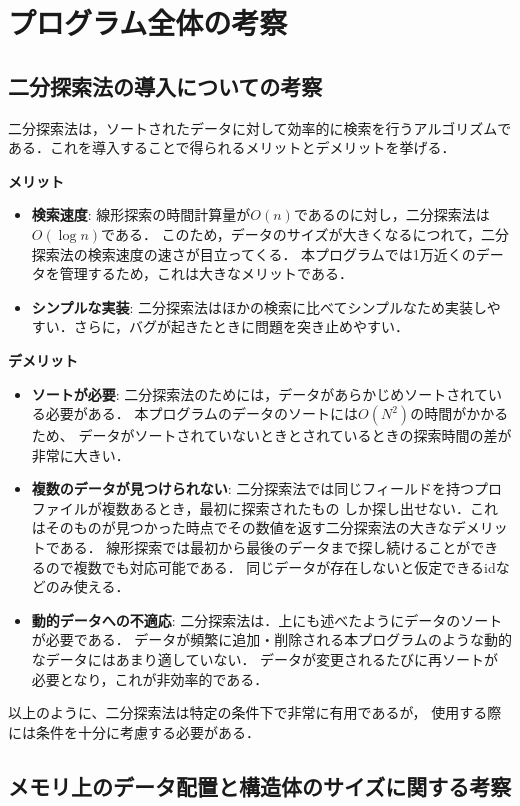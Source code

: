 \section{プログラム全体の考察}\label{consider}
  \subsection{二分探索法の導入についての考察}\label{consider1}
  二分探索法は，ソートされたデータに対して効率的に検索を行うアルゴリズムである．これを導入することで得られるメリットとデメリットを挙げる．

    \textbf{メリット}
    \begin{itemize}
    \item \textbf{検索速度}:
    線形探索の時間計算量が$O(n)$であるのに対し，二分探索法は$O(\log n)$である．
    このため，データのサイズが大きくなるにつれて，二分探索法の検索速度の速さが目立ってくる．
    本プログラムでは1万近くのデータを管理するため，これは大きなメリットである．
    \item \textbf{シンプルな実装}:
    二分探索法はほかの検索に比べてシンプルなため実装しやすい．さらに，バグが起きたときに問題を突き止めやすい．
    \end{itemize}

    \textbf{デメリット}
    \begin{itemize}
    \item \textbf{ソートが必要}:
    二分探索法のためには，データがあらかじめソートされている必要がある．
    本プログラムのデータのソートには$O(N^2)$の時間がかかるため、
    データがソートされていないときとされているときの探索時間の差が非常に大きい．
    \item \textbf{複数のデータが見つけられない}:
    二分探索法では同じフィールドを持つプロファイルが複数あるとき，最初に探索されたもの
    しか探し出せない．これはそのものが見つかった時点でその数値を返す二分探索法の大きなデメリットである．
    線形探索では最初から最後のデータまで探し続けることができるので複数でも対応可能である．
    同じデータが存在しないと仮定できるidなどのみ使える．
    \item \textbf{動的データへの不適応}:
    二分探索法は．上にも述べたようにデータのソートが必要である．
    データが頻繁に追加・削除される本プログラムのような動的なデータにはあまり適していない．
    データが変更されるたびに再ソートが必要となり，これが非効率的である．
    \end{itemize}
    以上のように、二分探索法は特定の条件下で非常に有用であるが，
    使用する際には条件を十分に考慮する必要がある．
\clearpage
\subsection{メモリ上のデータ配置と構造体のサイズに関する考察}\label{consider2}
